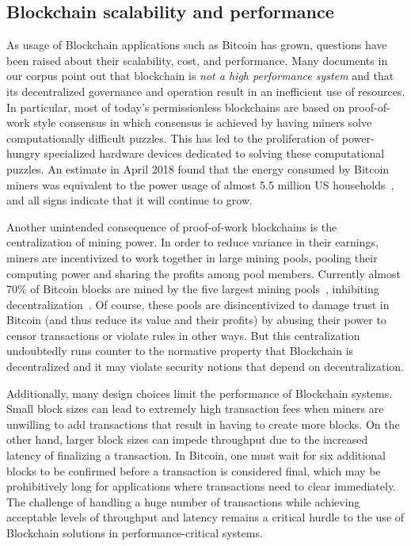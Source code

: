 \subsection{Blockchain scalability and performance}
As usage of Blockchain applications such as Bitcoin has grown, questions have been raised about their scalability, cost, and performance. Many documents in our corpus point out that blockchain is \emph{not a high performance system} and that its decentralized governance and operation result in an inefficient use of resources.  In particular, most of today's permissionless blockchains are based on proof-of-work style consensus in which consensus is achieved by having miners solve computationally difficult puzzles. This has led to the proliferation of power-hungry specialized hardware devices dedicated to solving these computational puzzles. An estimate in April 2018 found that the energy consumed by Bitcoin miners was equivalent to the power usage of almost 5.5 million US households~\cite{Digiconomist}, and all signs indicate that it will continue to grow.

Another unintended consequence of proof-of-work blockchains is the centralization of mining power.  In order to reduce variance in their earnings, miners are incentivized to work together in large mining pools, pooling their computing power and sharing the profits among pool members.  Currently almost 70\% of Bitcoin blocks are mined by the five largest mining pools~\cite{BlockchainInfoPools}, inhibiting decentralization~\cite{arxiv:GBERS18}. Of course, these pools are disincentivized to damage trust in Bitcoin (and thus reduce its value and their profits) by abusing their power to censor transactions or violate rules in other ways. But this centralization undoubtedly runs counter to the normative property that Blockchain is decentralized and it may violate security notions that depend on decentralization.  

Additionally, many design choices limit the performance of Blockchain systems.  Small block sizes can lead to extremely high transaction fees when miners are unwilling to add transactions that result in having to create more blocks.  On the other hand, larger block sizes can impede  throughput due to the increased latency of finalizing a transaction. In Bitcoin, one must wait for six additional blocks to be confirmed before a transaction is considered final, which may be prohibitively long for applications where transactions need to clear immediately. The challenge of handling a huge number of transactions while achieving acceptable levels of throughput and latency remains a critical hurdle to the use of Blockchain solutions in performance-critical systems.

